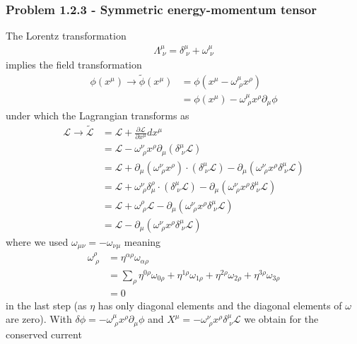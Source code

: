 \documentclass[10pt,a4paper]{article}
\theoremstyle{definition}
\begin{document}
\subsubsection{Problem 1.2.3 - Symmetric energy-momentum tensor}
The Lorentz transformation
\begin{align}
    \Lambda^\mu_{\;\nu}=\delta^\mu_{\;\nu}+\omega^\mu_{\;\nu}
\end{align}
implies the field transformation
\begin{align}
    \phi(x^\mu)\rightarrow\tilde\phi(x^\mu)&=\phi(x^\mu-\omega^\mu_{\;\rho}x^\rho)\\
    &=\phi(x^\mu)-\omega^\mu_{\;\rho}x^\rho\partial_\mu\phi
\end{align}
under which the Lagrangian transforms as
\begin{align}
    \mathcal{L}\rightarrow\tilde{\mathcal{L}}&=\mathcal{L}+\frac{\partial\mathcal{L}}{\partial x^\mu}dx^\mu\\
    &=\mathcal{L}-\omega^\nu_{\;\rho}x^\rho\partial_\mu(\delta^\mu_{\;\nu}\mathcal{L})\\
    &=\mathcal{L}+\partial_\mu(\omega^\nu_{\;\rho}x^\rho)\cdot(\delta^\mu_{\;\nu}\mathcal{L})-\partial_\mu(\omega^\nu_{\;\rho}x^\rho\delta^\mu_{\;\nu}\mathcal{L})\\
    &=\mathcal{L}+\omega^\nu_{\;\rho}\delta^\rho_\mu\cdot(\delta^\mu_{\;\nu}\mathcal{L})-\partial_\mu(\omega^\nu_{\;\rho}x^\rho\delta^\mu_{\;\nu}\mathcal{L})\\
    &=\mathcal{L}+\omega^\rho_{\;\rho}\mathcal{L}-\partial_\mu(\omega^\nu_{\;\rho}x^\rho\delta^\mu_{\;\nu}\mathcal{L})\\
    &=\mathcal{L}-\partial_\mu(\omega^\nu_{\;\rho}x^\rho\delta^\mu_{\;\nu}\mathcal{L})
\end{align}
where we used $\omega_{\mu\nu}=-\omega_{\nu\mu}$ meaning
\begin{align}
    \omega^\rho_{\;\rho}&=\eta^{\alpha\rho}\omega_{\alpha\rho}\\
    &=\sum_\rho\eta^{0\rho}\omega_{0\rho}+\eta^{1\rho}\omega_{1\rho}+\eta^{2\rho}\omega_{2\rho}+\eta^{3\rho}\omega_{3\rho}\\
    &=0
\end{align}    
in the last step (as $\eta$ has only diagonal elements and the diagonal elements of $\omega$ are zero). With $\delta\phi=-\omega^\mu_{\;\rho}x^\rho\partial_\mu\phi$ and $X^\mu=-\omega^\nu_{\;\rho}x^\rho\delta^\mu_{\;\nu}\mathcal{L}$ we obtain for the conserved current  
\end{document}

